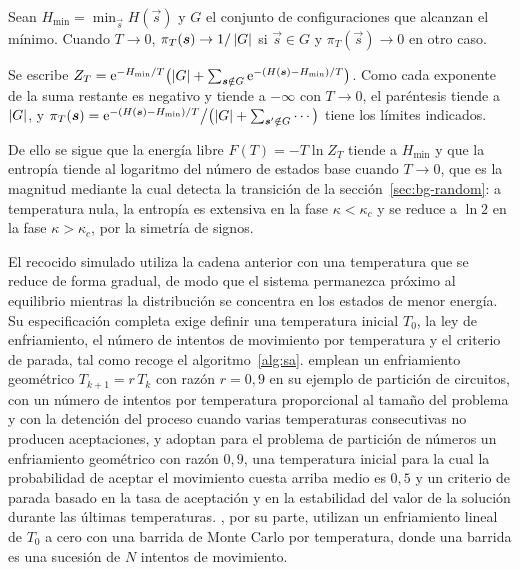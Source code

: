 \begin{lemma}\label{lem:zero-temp}
Sean $H_{\min} = \min_{\vec{s}} H(\vec{s})$ y $G$ el conjunto de configuraciones que alcanzan el mínimo. Cuando $T \to 0$, $\pi_T(\boldsymbol{s}) \to 1/\left\lvert G \right\rvert$ si $\vec{s} \in G$ y $\pi_T(\vec{s}) \to 0$ en otro caso.
\end{lemma}

\begin{demostracion}
Se escribe $Z_T = \mathrm{e}^{-H_{\min}/T}\bigl(\left\lvert G \right\rvert + \sum_{\boldsymbol{s} \notin G} \mathrm{e}^{-(H(\boldsymbol{s}) - H_{\min})/T}\bigr)$. Como cada exponente de la suma restante es negativo y tiende a $-\infty$ con $T \to 0$, el paréntesis tiende a $\left\lvert G \right\rvert$, y $\pi_T(\boldsymbol{s}) = \mathrm{e}^{-(H(\boldsymbol{s}) - H_{\min})/T}\big/\bigl(\left\lvert G \right\rvert + \sum_{\boldsymbol{s}'\notin G} \cdots\bigr)$ tiene los límites indicados.
\end{demostracion}

De ello se sigue que la energía libre $F(T) = -T\ln Z_T$ tiende a $H_{\min}$ y que la entropía tiende al logaritmo del número de estados base cuando $T \to 0$, que es la magnitud mediante la cual \textcite{mertens2001} detecta la transición de la sección~\ref{sec:bg-random}: a temperatura nula, la entropía es extensiva en la fase $\kappa < \kappa_c$ y se reduce a $\ln 2$ en la fase $\kappa > \kappa_c$, por la simetría de signos.

El recocido simulado utiliza la cadena anterior con una temperatura que se reduce de forma gradual, de modo que el sistema permanezca próximo al equilibrio mientras la distribución se concentra en los estados de menor energía. Su especificación completa exige definir una temperatura inicial $T_0$, la ley de enfriamiento, el número de intentos de movimiento por temperatura y el criterio de parada, tal como recoge el algoritmo~\ref{alg:sa}. \textcite{kirkpatrick1983} emplean un enfriamiento geométrico $T_{k+1} = r\,T_k$ con razón $r = 0{,}9$ en su ejemplo de partición de circuitos, con un número de intentos por temperatura proporcional al tamaño del problema y con la detención del proceso cuando varias temperaturas consecutivas no producen aceptaciones, y \textcite{johnson1991} adoptan para el problema de partición de números un enfriamiento geométrico con razón $0{,}9$, una temperatura inicial para la cual la probabilidad de aceptar el movimiento cuesta arriba medio es $0{,}5$ y un criterio de parada basado en la tasa de aceptación y en la estabilidad del valor de la solución durante las últimas temperaturas. \textcite{angelini2026}, por su parte, utilizan un enfriamiento lineal de $T_0$ a cero con una barrida de Monte Carlo por temperatura, donde una barrida es una sucesión de $N$ intentos de movimiento.

